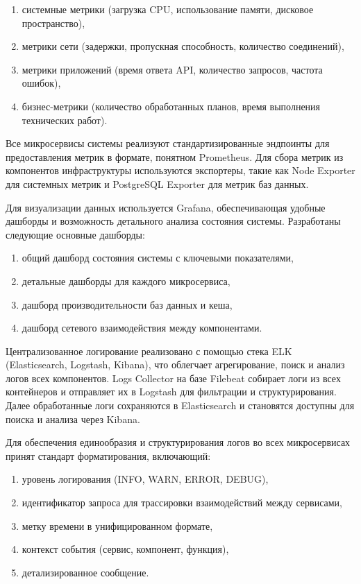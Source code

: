 \documentclass[14pt,a4paper]{extarticle}
\begin{document}
\begin{enumerate}
\item системные метрики (загрузка CPU, использование памяти, дисковое пространство),
\item метрики сети (задержки, пропускная способность, количество соединений),
\item метрики приложений (время ответа API, количество запросов, частота ошибок),
\item бизнес-метрики (количество обработанных планов, время выполнения технических работ).
\end{enumerate}

Все микросервисы системы реализуют стандартизированные эндпоинты для предоставления метрик в формате, понятном Prometheus. Для сбора метрик из компонентов инфраструктуры используются экспортеры, такие как Node Exporter для системных метрик и PostgreSQL Exporter для метрик баз данных.

Для визуализации данных используется Grafana, обеспечивающая удобные дашборды и возможность детального анализа состояния системы. Разработаны следующие основные дашборды:

\begin{enumerate}
\item общий дашборд состояния системы с ключевыми показателями,
\item детальные дашборды для каждого микросервиса,
\item дашборд производительности баз данных и кеша,
\item дашборд сетевого взаимодействия между компонентами.
\end{enumerate}

Централизованное логирование реализовано с помощью стека ELK (Elasticsearch, Logstash, Kibana), что облегчает агрегирование, поиск и анализ логов всех компонентов. Logs Collector на базе Filebeat собирает логи из всех контейнеров и отправляет их в Logstash для фильтрации и структурирования. Далее обработанные логи сохраняются в Elasticsearch и становятся доступны для поиска и анализа через Kibana.

Для обеспечения единообразия и структурирования логов во всех микросервисах принят стандарт форматирования, включающий:

\begin{enumerate}
\item уровень логирования (INFO, WARN, ERROR, DEBUG),
\item идентификатор запроса для трассировки взаимодействий между сервисами,
\item метку времени в унифицированном формате,
\item контекст события (сервис, компонент, функция),
\item детализированное сообщение.
\end{enumerate}
\end{document}
